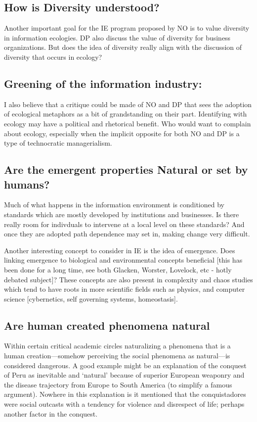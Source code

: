 \subsection{How is Diversity understood?}

Another important goal for the IE program proposed by NO is to value diversity in information ecologies. DP also discuss the value of diversity for business organizations. But does the idea of diversity really align with the discussion of diversity that occurs in ecology?

\subsection{Greening of the information industry:}

I also believe that a critique could be made of NO and DP that sees the adoption of ecological metaphors as a bit of grandstanding on their part. Identifying with ecology may have a political and rhetorical benefit. Who would want to complain about ecology, especially when the implicit opposite for both NO and DP is a type of technocratic managerialism.

\subsection{Are the emergent properties Natural or set by humans?}

Much of what happens in the information environment is conditioned by standards which are mostly developed by institutions and businesses. Is there really room for indivduals to intervene at a local level on these standards? And once they are adopted path dependence may set in, making change very difficult.

Another interesting concept to consider in IE is the idea of emergence. Does linking emergence to biological and environmental concepts beneficial [this has been done for a long time, see both Glacken, Worster, Lovelock, etc - hotly debated subject]? These concepts are also present in complexity and chaos studies which tend to have roots in more scientific fields such as physics, and computer science [cybernetics, self governing systems, homeostasis].

\subsection{Are human created phenomena natural}

Within certain critical academic circles naturalizing a phenomena that is a human creation—somehow perceiving the social phenomena as natural—is considered dangerous. A good example might be an explanation of the conquest of Peru as inevitable and ‘natural’ because of superior European weaponry and the disease trajectory from Europe to South America (to simplify a famous argument). Nowhere in this explanation is it mentioned that the conquistadores were social outcasts with a tendency for violence and disrespect of life; perhaps another factor in the conquest. 

